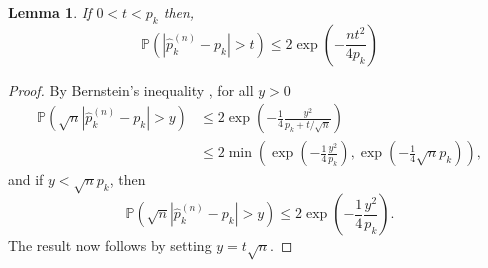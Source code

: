 \documentclass[sn-mathphys-ay]{sn-jnl}%
\newtheorem{lemma}{Lemma}[section]
\renewcommand{\P}{\mathbb{P}}
\begin{document}
\begin{appendices}
\begin{lemma}\label{lemma:markov:bernstein}If \(0<t<p_k\) then,
    \begin{equation}
        \P \left(\left| \widehat{p}^{(n)}_k-p_k \right|>t \right)\leq 2 \exp{\left(-\frac{nt^2}{4p_k}\right)}
    \end{equation}
\end{lemma}
\begin{proof}
    By Bernstein's inequality \cite[Lemma 19.32]{Vaart2000}, for all \(y>0\)
    \begin{align*}
        \P \left(\sqrt{n} \left| \widehat{p}^{(n)}_k-p_k \right|>y \right) & \leq 2 \exp{\left(-\frac{1}{4}\frac{y^2}{p_k+t/\sqrt{n}}\right)}                                                      \\
                                                                           & \leq  2 \min \left( \exp\left(-\frac{1}{4}\frac{y^2}{p_k}\right),\exp\left(-\frac{1}{4}\sqrt{n}{p_k}\right)  \right),
    \end{align*}
    and if \(y<\sqrt{n}p_k\), then
    \begin{equation*}
        \P \left(\sqrt{n} \left| \widehat{p}^{(n)}_k-p_k \right|>y \right)\leq 2  \exp\left(-\frac{1}{4}\frac{y^2}{p_k}\right).
    \end{equation*}
    The result now follows by setting \(y=t\sqrt{n}\).
\end{proof}


\end{appendices}
\end{document}

